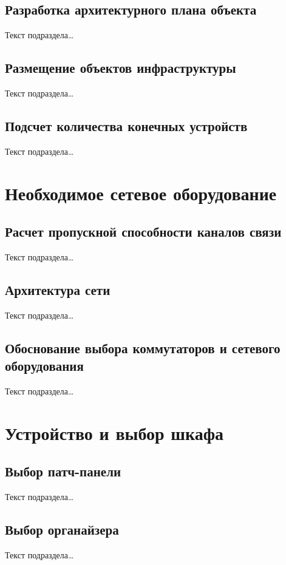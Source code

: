 \documentclass[a4paper,oneside,14pt]{extreport}
\begin{document}
\section{Разработка архитектурного плана объекта}
Текст подраздела\ldots

\section{Размещение объектов инфраструктуры}
Текст подраздела\ldots

\section{Подсчет количества конечных устройств}
Текст подраздела\ldots


\chapter{Необходимое сетевое оборудование}

\section{Расчет пропускной способности каналов связи}
Текст подраздела\ldots

\section{Архитектура сети}
Текст подраздела\ldots

\section{Обоснование выбора коммутаторов и сетевого оборудования}
Текст подраздела\ldots


\chapter{Устройство и выбор шкафа}

\section{Выбор патч-панели}
Текст подраздела\ldots

\section{Выбор органайзера}
Текст подраздела\ldots
\end{document}
